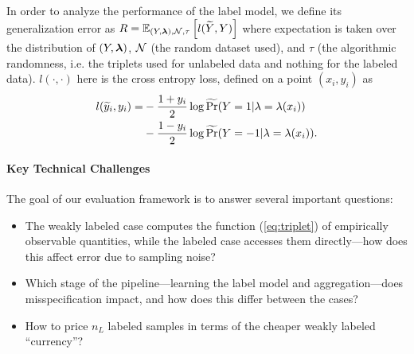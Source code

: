 In order to analyze the performance of the label model, we define its generalization error as $R = \mathbb{E}_{(Y, \bm{\lambda}), \mathcal{N}, \tau}\left[l(\widetilde{Y}, Y)\right]$ where expectation is taken over the distribution of $(Y, \bm{\lambda})$, $\mathcal{N}$ (the random dataset used), and $\tau$ (the algorithmic randomness, i.e. the triplets used for unlabeled data and nothing for the labeled data). $l(\cdot, \cdot)$ here is the cross entropy loss, defined on a point $(x_i, y_i)$ as
\begin{align*}
l(\widetilde{y}_i, y_i) = &-\frac{1 + y_i}{2} \log \widetilde{\Pr}(Y = 1 | \lambda = \lambda(x_i)) \\
&- \frac{1 - y_i}{2} \log \widetilde{\Pr}(Y = -1 | \lambda = \lambda(x_i)).
\end{align*}

\paragraph{Key Technical Challenges}
The goal of our evaluation framework is to answer several important questions:
\begin{itemize}
    \item The weakly labeled case computes the function (\ref{eq:triplet}) of empirically observable quantities, while the labeled case accesses them directly---how does this affect error due to sampling noise? 
    \item Which stage of the pipeline---learning the label model and aggregation---does misspecification impact, and how does this differ between the cases?
    \item How to price $n_L$ labeled samples in terms of the cheaper weakly labeled ``currency''?
\end{itemize}







